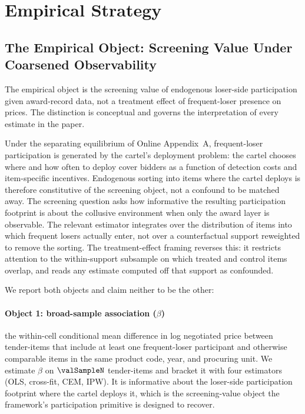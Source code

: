 \section{Empirical Strategy}
\label{sec:empirical}

\subsection{The Empirical Object: Screening Value Under Coarsened
Observability}
\label{sec:emp_estimand}

The empirical object is the screening value of endogenous
loser-side participation given award-record data, not a
treatment effect of frequent-loser presence on prices. The
distinction is conceptual and governs the interpretation of
every estimate in the paper.

Under the separating equilibrium of Online Appendix~A,
frequent-loser participation is generated by the cartel's
deployment problem: the cartel chooses where and how often to
deploy cover bidders as a function of detection costs and
item-specific incentives. Endogenous sorting into items where
the cartel deploys is therefore constitutive of the screening
object, not a confound to be matched away. The screening
question asks how informative the resulting participation
footprint is about the collusive environment when only the
award layer is observable. The relevant estimator integrates
over the distribution of items into which frequent losers
actually enter, not over a counterfactual support reweighted to
remove the sorting. The treatment-effect framing reverses this:
it restricts attention to the within-support subsample on which
treated and control items overlap, and reads any estimate
computed off that support as confounded.

We report both objects and claim neither to be the other:

\paragraph{Object 1: broad-sample association ($\beta$)} the
within-cell conditional mean difference in log negotiated price
between tender-items that include at least one frequent-loser
participant and otherwise comparable items in the same product
code, year, and procuring unit. We estimate $\beta$ on
$\valSampleN$ tender-items and bracket it with four estimators
(OLS, cross-fit, CEM, IPW). It is informative about the
loser-side participation footprint where the cartel deploys it,
which is the screening-value object the framework's
participation primitive is designed to recover.

